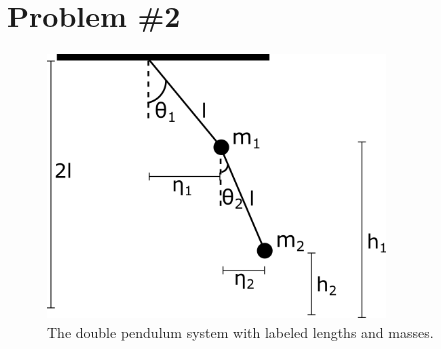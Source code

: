 \documentclass[11pt]{article}
\numberwithin{equation}{section}
\begin{document}
\section{Problem \#2}
\begin{figure}
\centering
\includegraphics[width=0.8\textwidth]{figure.png}
\caption{The double pendulum system with labeled lengths and masses.}
\label{figure}
\end{figure}
\end{document}

